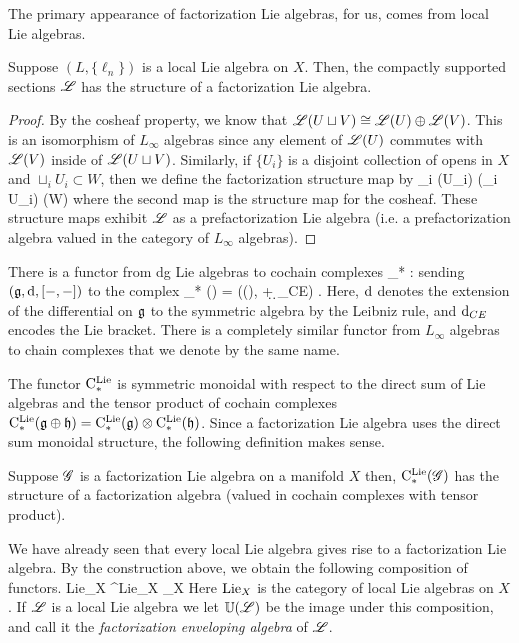 The primary appearance of factorization Lie algebras, for us, comes from local Lie algebras.
 
\begin{lem}
Suppose $(L, \{\ell_n\})$ is a local Lie algebra on $X$.
Then, the compactly supported sections $\mathscr L$ has the structure of a factorization Lie algebra.
\end{lem}
\begin{proof}
By the cosheaf property, we know that $\mathscr L(U \sqcup V) \cong \mathscr L(U) \oplus \mathscr L(V)$. 
This is an isomorphism of $L_\infty$ algebras since any element of $\mathscr L(U)$ commutes with $\mathscr L(V)$ inside of $\mathscr L(U \sqcup V)$. 
Similarly, if $\{U_i\}$ is a disjoint collection of opens in $X$ and $\sqcup_i U_i \subset W$, then we define the factorization structure map by
\ben
\oplus_i \sL(U_i) \cong \sL(\sqcup_i U_i) \to \sL (W)
\een
where the second map is the structure map for the cosheaf. 
These structure maps exhibit $\mathscr L$ as a prefactorization Lie algebra (i.e. a prefactorization algebra valued in the category of $L_\infty$ algebras). 
\end{proof}

There is a functor from dg Lie algebras to cochain complexes 
\ben
\clieu_* : \dgLie \to \Ch
\een
sending $(\mathfrak g, {\rm d} , [-,-])$ to the complex
\ben
\clieu_* (\fg) = \left(\Sym(\fg[1]), \d + \d_{CE}\right) .
\een
Here, ${\rm d}$ denotes the extension of the differential on $\mathfrak g$ to the symmetric algebra by the Leibniz rule, and ${\rm d}_{CE}$ encodes the Lie bracket.
There is a completely similar functor from $L_\infty$ algebras to chain complexes that we denote by the same name.

The functor ${\rm C}^{\rm Lie}_*$ is symmetric monoidal with respect to the direct sum of Lie algebras and the tensor product of cochain complexes ${\rm C}^{\rm Lie}_*(\mathfrak g \oplus \mathfrak h) = {\rm C}^{\rm Lie}_*(\mathfrak g) \otimes {\rm C}^{\rm Lie}_*(\mathfrak h)$. 
Since a factorization Lie algebra uses the direct sum monoidal structure, the following definition makes sense.

\begin{dfn/lem}
Suppose $\mathscr G$ is a factorization Lie algebra on a manifold $X$ then, ${\rm C}^{\rm Lie}_*(\mathscr G)$ has the structure of a factorization algebra (valued in cochain complexes with tensor product). 
\end{dfn/lem}

We have already seen that every local Lie algebra gives rise to a factorization Lie algebra.
By the construction above, we obtain the following composition of functors.
\ben
{\rm Lie}_X ^{\rm Lie}_X _X
\een
Here ${\rm Lie}_X$ is the category of local Lie algebras on $X$.
If $\mathscr L$ is a local Lie algebra we let $\mathbb U(\mathscr L)$ be the image under this composition, and call it the {\em factorization enveloping algebra} of $\mathscr L$. 

